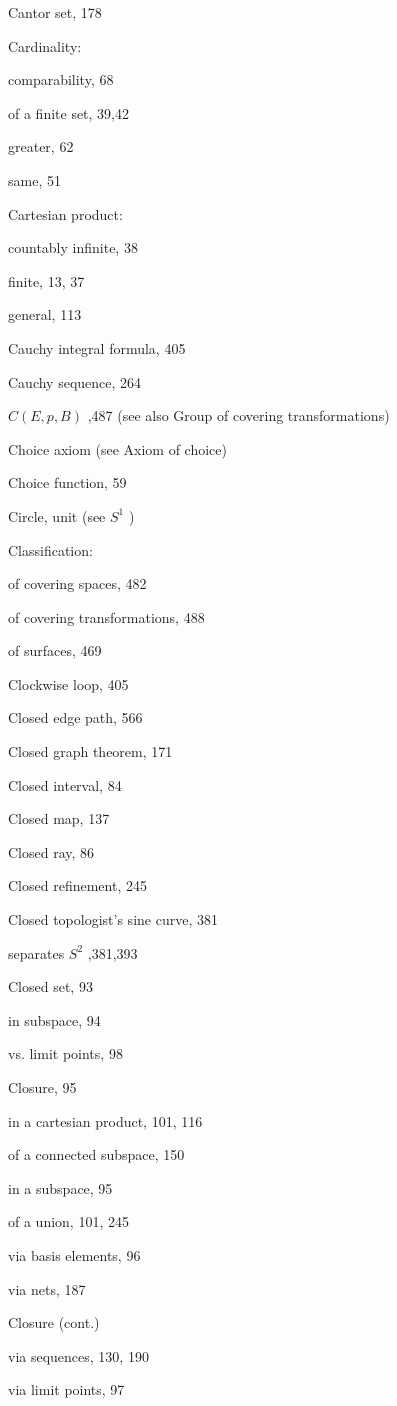Cantor set, 178

Cardinality:

comparability, 68

of a finite set, 39,42

greater, 62

same, 51

Cartesian product:

countably infinite, 38

finite, 13, 37

general, 113

Cauchy integral formula, 405

Cauchy sequence, 264

\(C\left( {E,p,B}\right)\) ,487 (see also Group of covering transformations)

Choice axiom (see Axiom of choice)

Choice function, 59

Circle, unit (see \({S}^{1}\) )

Classification:

of covering spaces, 482

of covering transformations, 488

of surfaces, 469

Clockwise loop, 405

Closed edge path, 566

Closed graph theorem, 171

Closed interval, 84

Closed map, 137

Closed ray, 86

Closed refinement, 245

Closed topologist's sine curve, 381

separates \({S}^{2}\) ,381,393

Closed set, 93

in subspace, 94

vs. limit points, 98

Closure, 95

in a cartesian product, 101, 116

of a connected subspace, 150

in a subspace, 95

of a union, 101, 245

via basis elements, 96

via nets, 187

Closure (cont.)

via sequences, 130, 190

via limit points, 97

